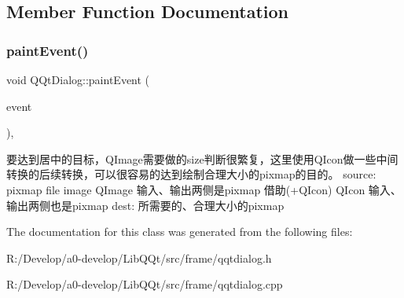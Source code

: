 \subsection{Member Function Documentation}
\mbox{\label{class_q_qt_dialog_a9d4b5c8f382b9861516ac9ec22017719}} 
\subsubsection{\texorpdfstring{paint\+Event()}{paintEvent()}}
{\footnotesize\ttfamily void Q\+Qt\+Dialog\+::paint\+Event (\begin{DoxyParamCaption}\item[{Q\+Paint\+Event $\ast$}]{event }\end{DoxyParamCaption})\hspace{0.3cm}{\ttfamily [override]}, {\ttfamily [protected]}}

要达到居中的目标，\+Q\+Image需要做的size判断很繁复，这里使用\+Q\+Icon做一些中间转换的后续转换，可以很容易的达到绘制合理大小的pixmap的目的。 source\+: pixmap file image Q\+Image 输入、输出两侧是pixmap 借助(+\+Q\+Icon) Q\+Icon 输入、输出两侧也是pixmap dest\+: 所需要的、合理大小的pixmap

The documentation for this class was generated from the following files\+:\begin{DoxyCompactItemize}
\item 
R\+:/\+Develop/a0-\/develop/\+Lib\+Q\+Qt/src/frame/qqtdialog.\+h\item 
R\+:/\+Develop/a0-\/develop/\+Lib\+Q\+Qt/src/frame/qqtdialog.\+cpp\end{DoxyCompactItemize}
